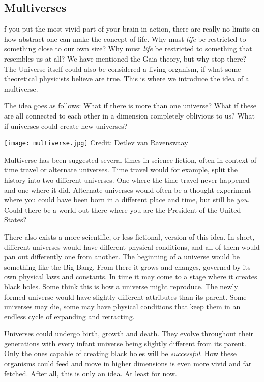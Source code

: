 \subsection{Multiverses}
f you put the most vivid part of your brain in action, there are really no limits on how abstract one can make the concept of life.
Why must \textit{life} be restricted to something close to our own size?
Why must \textit{life} be restricted to something that resembles us at all?
We have mentioned the Gaia theory, but why stop there?
The Universe itself could also be considered a living organism, if what some theoretical physicists believe are true.
This is where we introduce the idea of a multiverse.

The idea goes as follows:
What if there is more than one universe?
What if these are all connected to each other in a dimension completely oblivious to us?
What if universes could create new universes?

\begin{center}
	\texttt{[image: multiverse.jpg]}
	\tiny{Credit: Detlev van Ravenswaay}
\end{center}

Multiverse has been suggested several times in science fiction, often in context of time travel or alternate universes.
Time travel would for example, split the history into two different universes.
One where the time travel never happened and one where it did.
Alternate universes would often be a thought experiment where you could have been born in a different place and time, but still be \textit{you}.
Could there be a world out there where you are the President of the United States?

There also exists a more scientific, or less fictional, version of this idea.
In short, different universes would have different physical conditions, and all of them would pan out differently one from another.
The beginning of a universe would be something like the Big Bang.
From there it grows and changes, governed by its own physical laws and constants.
In time it may come to a stage where it creates black holes.
Some think this is how a universe might reproduce.
The newly formed universe would have slightly different attributes than its parent.
Some universes may die, some may have physical conditions that keep them in an endless cycle of expanding and retracting.

Universes could undergo birth, growth and death.
They evolve throughout their generations with every infant universe being slightly different from its parent.
Only the ones capable of creating black holes will be \textit{successful}.
How these organisms could feed and move in higher dimensions is even more vivid and far fetched.
After all, this is only an idea.
At least for now.